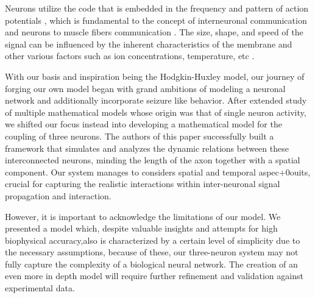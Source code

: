 \documentclass[class={myRUCProject}, crop=false]{standalone}
\begin{document}
Neurons utilize the code that is embedded in the frequency and pattern of action potentials \cite{wood1996neuroscience}, which is fundamental to the concept of interneuronal communication and neurons to muscle fibers communication \cite{ramachandran2002encyclopedia}. The size, shape, and speed of the signal can be influenced by the inherent characteristics of the membrane \cite{kandel2000principles} and other various factors such as ion concentrations, temperature, etc \cite{kandel2000principles}.

With our basis and inspiration being the Hodgkin-Huxley model, our journey of forging our own model began with grand ambitions 
of modeling a neuronal network and additionally incorporate seizure like behavior.
After extended study of multiple mathematical models whose origin was that of single neuron activity, we shifted our focus instead into developing a mathematical model for the coupling of three neurons.
The authors of this paper successfully built a framework that simulates and analyzes the dynamic relations between these interconnected neurons, minding the length of the axon together with a spatial component. 
Our system manages to considers spatial and temporal aspec+0ouits, crucial for capturing the realistic interactions within inter-neuronal signal propagation and interaction.

However, 
it is important to acknowledge the limitations of our model. 
We presented a model which, despite
valuable insights and
attempts for high biophysical accuracy,also is characterized by a certain level of simplicity due to the necessary assumptions,
because of these, our three-neuron system may not fully capture the complexity of a biological neural network. 
The creation of an even more in depth model will require further refinement and validation against experimental data.


\end{document}
